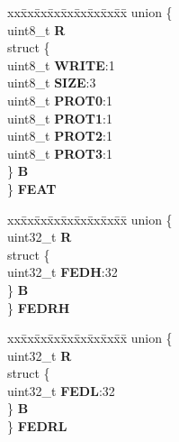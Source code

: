 \begin{DoxyCompactItemize}
\begin{tabbing}
\end{tabbing}\item 
\mbox{\label{structECSM__tag_ae8a482e40370d94545b81fbe123c001d}} 
\begin{tabbing}
xx\=xx\=xx\=xx\=xx\=xx\=xx\=xx\=xx\=\kill
union \{\\
\>uint8\_t {\bfseries R}\\
\>struct \{\\
\>\>uint8\_t {\bfseries WRITE}:1\\
\>\>uint8\_t {\bfseries SIZE}:3\\
\>\>uint8\_t {\bfseries PROT0}:1\\
\>\>uint8\_t {\bfseries PROT1}:1\\
\>\>uint8\_t {\bfseries PROT2}:1\\
\>\>uint8\_t {\bfseries PROT3}:1\\
\>\} {\bfseries B}\\
\} {\bfseries FEAT}\\

\end{tabbing}\item 
\mbox{\label{structECSM__tag_adddffde6fe4888a9840aa187a2b53a29}} 
\begin{tabbing}
xx\=xx\=xx\=xx\=xx\=xx\=xx\=xx\=xx\=\kill
union \{\\
\>uint32\_t {\bfseries R}\\
\>struct \{\\
\>\>uint32\_t {\bfseries FEDH}:32\\
\>\} {\bfseries B}\\
\} {\bfseries FEDRH}\\

\end{tabbing}\item 
\mbox{\label{structECSM__tag_a7d888374d29dbd796f95335235d018ba}} 
\begin{tabbing}
xx\=xx\=xx\=xx\=xx\=xx\=xx\=xx\=xx\=\kill
union \{\\
\>uint32\_t {\bfseries R}\\
\>struct \{\\
\>\>uint32\_t {\bfseries FEDL}:32\\
\>\} {\bfseries B}\\
\} {\bfseries FEDRL}\\


\end{tabbing}
\end{DoxyCompactItemize}
